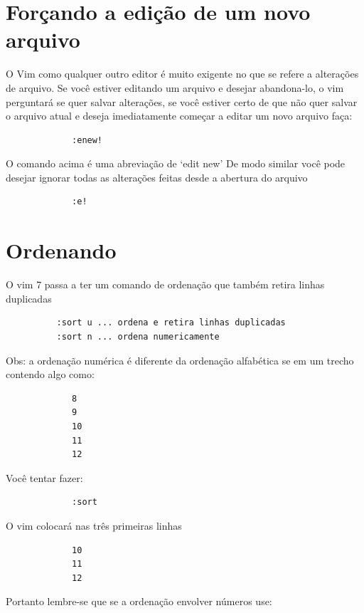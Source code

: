 \documentclass[10pt,a4paper,openany]{book}
\begin{document}
\section{Forçando a edição de um novo arquivo}\label{sec:Forçando a edição de um novo arquivo}

O Vim como qualquer outro editor é muito exigente no que se refere a alterações
de arquivo.  Se você estiver editando um arquivo e desejar abandona-lo, o vim
perguntará se quer salvar alterações, se você estiver certo de que não quer
salvar o arquivo atual e deseja imediatamente começar a editar um novo arquivo
faça:

\begin{verbatim}
			 :enew!
\end{verbatim}

O comando acima é uma abreviação de `edit new' De modo similar você pode
desejar ignorar todas as alterações feitas desde a abertura do arquivo

\begin{verbatim}
			 :e!
\end{verbatim}


\section{Ordenando}

O vim 7 passa a ter um comando de ordenação que também retira linhas
duplicadas

\begin{verbatim}
		  :sort u ... ordena e retira linhas duplicadas
		  :sort n ... ordena numericamente
\end{verbatim}

Obs: a ordenação numérica é diferente da ordenação alfabética se em um
trecho contendo algo como:

\begin{verbatim}
			 8
			 9
			 10
			 11
			 12
\end{verbatim}

Você tentar fazer:

\begin{verbatim}
			 :sort
\end{verbatim}

O vim colocará nas três primeiras linhas

\begin{verbatim}
			 10
			 11
			 12
\end{verbatim}

Portanto lembre-se que se a ordenação envolver números use:
\end{document}
